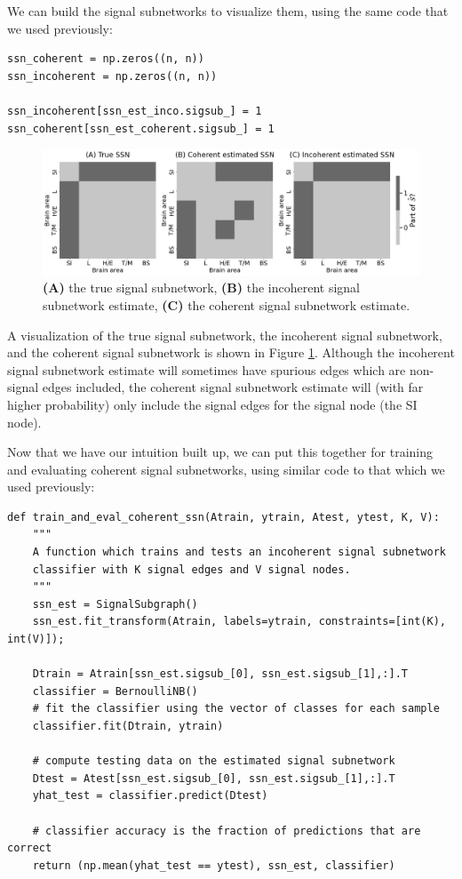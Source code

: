We can build the signal subnetworks to visualize them, using the same code that we used previously:

\begin{lstlisting}[style=python]
ssn_coherent = np.zeros((n, n))
ssn_incoherent = np.zeros((n, n))

ssn_incoherent[ssn_est_inco.sigsub_] = 1
ssn_coherent[ssn_est_coherent.sigsub_] = 1
\end{lstlisting}

\begin{figure}
    \centering
    \includegraphics[width=\linewidth]{applications/ch9/Images/ssn_co.png}
    \caption[Comparing coherent and incoherent signal subnetwork estimates.]{\textbf{(A)} the true signal subnetwork, \textbf{(B)} the incoherent signal subnetwork estimate, \textbf{(C)} the coherent signal subnetwork estimate.}
    \label{fig:ch9:ssn:ssn_coh}
\end{figure}
A visualization of the true signal subnetwork, the incoherent signal subnetwork, and the coherent signal subnetwork is shown in Figure \ref{fig:ch9:ssn:ssn_coh}. Although the incoherent signal subnetwork estimate will sometimes have spurious edges which are non-signal edges included, the coherent signal subnetwork estimate will (with far higher probability) only include the signal edges for the signal node (the SI node). 

Now that we have our intuition built up, we can put this together for training and evaluating coherent signal subnetworks, using similar code to that which we used previously:

\begin{lstlisting}[style=python]
def train_and_eval_coherent_ssn(Atrain, ytrain, Atest, ytest, K, V):
    """
    A function which trains and tests an incoherent signal subnetwork
    classifier with K signal edges and V signal nodes.
    """
    ssn_est = SignalSubgraph()
    ssn_est.fit_transform(Atrain, labels=ytrain, constraints=[int(K), int(V)]);

    Dtrain = Atrain[ssn_est.sigsub_[0], ssn_est.sigsub_[1],:].T
    classifier = BernoulliNB()
    # fit the classifier using the vector of classes for each sample
    classifier.fit(Dtrain, ytrain)

    # compute testing data on the estimated signal subnetwork
    Dtest = Atest[ssn_est.sigsub_[0], ssn_est.sigsub_[1],:].T
    yhat_test = classifier.predict(Dtest)
    
    # classifier accuracy is the fraction of predictions that are correct
    return (np.mean(yhat_test == ytest), ssn_est, classifier)
\end{lstlisting}

